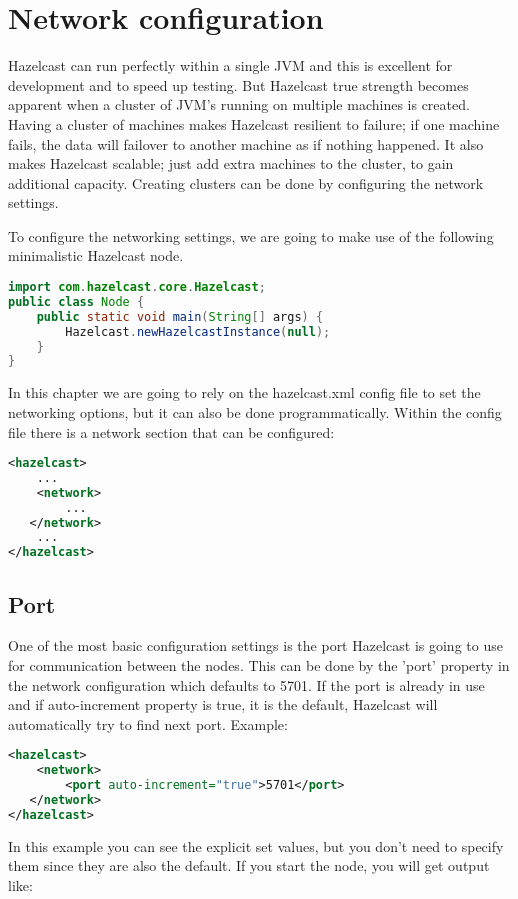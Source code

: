 \chapter{Network configuration}

Hazelcast can run perfectly within a single JVM and this is excellent for development and to speed up testing. But Hazelcast true strength becomes apparent when a cluster of JVM's running on multiple machines is created. Having a cluster of machines makes Hazelcast resilient to failure; if one machine fails, the data will failover to another machine as if nothing happened. It also makes Hazelcast scalable; just add extra machines to the cluster, to gain additional capacity. Creating clusters can be done by configuring the network settings.

To configure the networking settings, we are going to make use of the following minimalistic Hazelcast node.
\begin{lstlisting}[language=java]
import com.hazelcast.core.Hazelcast;
public class Node {
    public static void main(String[] args) {
        Hazelcast.newHazelcastInstance(null);
    }
}
\end{lstlisting}

In this chapter we are going to rely on the hazelcast.xml config file to set the networking options, but it can also be done programmatically. Within the config file there is a network section that can be configured:
\begin{lstlisting}[language=xml]
<hazelcast>
    ...
    <network>
        ...  
   </network>
    ...
</hazelcast>
\end{lstlisting}

\section{Port}
One of the most basic configuration settings is the port Hazelcast is going to use for communication between the nodes. This can be done by the 'port' property in the network configuration which defaults to 5701. If the port is already in use and if auto-increment property is true, it is the default, Hazelcast will automatically try to find next port. Example:
\begin{lstlisting}[language=xml]
<hazelcast>
    <network>
        <port auto-increment="true">5701</port>
   </network>
</hazelcast>
\end{lstlisting}
In this example you can see the explicit set values, but you don't need to specify them since they are also the default. If you start the node, you will get output like:


